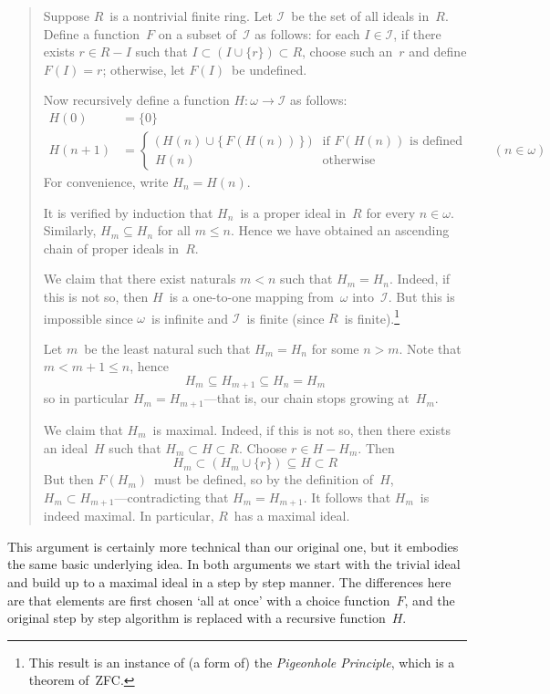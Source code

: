 \documentclass[letterpaper]{article}
\newcommand{\I}{\mathcal{I}}
\newcommand{\union}{\cup}
\begin{document}
\begin{quote}
Suppose $R$~is a nontrivial finite ring. Let $\I$~be the set of all ideals in~$R$. Define a function~$F$ on a subset of~$\I$ as follows: for each $I\in\I$, if there exists $r\in R-I$ such that $I\subset (I\union\{r\})\subset R$, choose such an~$r$ and define $F(I)=r$; otherwise, let $F(I)$~be undefined.

Now recursively define a function $H:\omega\to\I$ as follows:
\begin{align*}
H(0)&=\{0\}\\
H(n+1)&=
\begin{cases}
\bigl(\,H(n)\union\{\,F(H(n))\,\}\,\bigr)&\text{if }F(H(n))\text{ is defined}\\
H(n)&\text{otherwise}
\end{cases}\qquad(n\in\omega)
\end{align*}
For convenience, write $H_n=H(n)$.

It is verified by induction that $H_n$~is a proper ideal in~$R$ for every $n\in\omega$. Similarly, $H_m\subseteq H_n$ for all $m\le n$. Hence we have obtained an ascending chain of proper ideals in~$R$.

We claim that there exist naturals $m<n$ such that $H_m=H_n$. Indeed, if this is not so, then $H$~is a one-to-one mapping from~$\omega$ into~$\I$. But this is impossible since $\omega$~is infinite and $\I$~is finite (since $R$~is finite).\footnote{This result is an instance of (a form of) the \emph{Pigeonhole Principle}, which is a theorem of~ZFC.}

Let $m$~be the least natural such that $H_m=H_n$ for some $n>m$. Note that $m<m+1\le n$, hence
$$H_m\subseteq H_{m+1}\subseteq H_n=H_m$$
so in particular $H_m=H_{m+1}$---that is, our chain stops growing at~$H_m$.

We claim that $H_m$~is maximal. Indeed, if this is not so, then there exists an ideal~$H$ such that $H_m\subset H\subset R$. Choose $r\in H-H_m$. Then
$$H_m\subset(H_m\union\{r\})\subseteq H\subset R$$
But then $F(H_m)$~must be defined, so by the definition of~$H$, $H_m\subset H_{m+1}$---contradicting that $H_m=H_{m+1}$. It follows that $H_m$~is indeed maximal. In particular, $R$~has a maximal ideal.
\end{quote}
This argument is certainly more technical than our original one, but it embodies the same basic underlying idea. In both arguments we start with the trivial ideal and build up to a maximal ideal in a step by step manner. The differences here are that elements are first chosen `all at once' with a choice function~$F$, and the original step by step algorithm is replaced with a recursive function~$H$.
\end{document}
